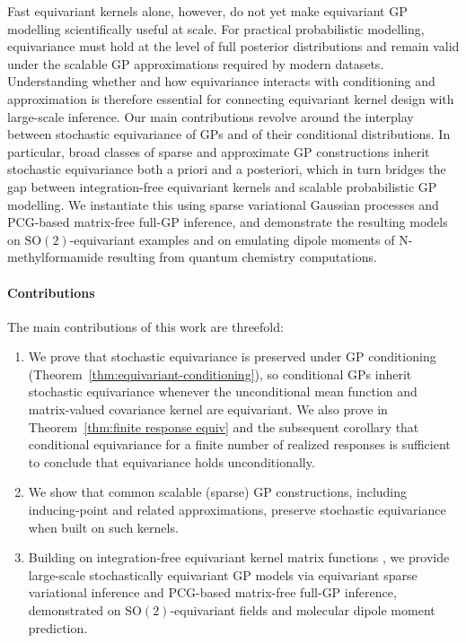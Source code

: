 \documentclass[11pt,a4paper]{article}
\begin{document}
Fast equivariant kernels alone, however, do not yet make equivariant GP modelling scientifically useful at scale. For practical probabilistic modelling, equivariance must hold at the level of full posterior distributions and remain valid under the scalable GP approximations required by modern datasets. Understanding whether and how equivariance interacts with conditioning and approximation is therefore essential for connecting equivariant kernel design with large-scale inference. Our main contributions revolve around the interplay between stochastic equivariance of GPs and of their conditional distributions. In particular, broad classes of sparse and approximate GP constructions inherit stochastic equivariance both a priori and a posteriori, which in turn bridges the gap between integration-free equivariant kernels and scalable probabilistic GP modelling. We instantiate this using sparse variational Gaussian processes and PCG-based matrix-free full-GP inference, and demonstrate the resulting models on $\mathrm{SO}(2)$-equivariant examples and on emulating dipole moments of N-methylformamide resulting from quantum chemistry computations.

\paragraph{Contributions}
The main contributions of this work are threefold:
\begin{enumerate}
    \item We prove that stochastic equivariance is preserved under GP conditioning (Theorem~\ref{thm:equivariant-conditioning}), so conditional GPs inherit stochastic equivariance whenever the unconditional mean function and matrix-valued covariance kernel are equivariant. We also prove in Theorem~\ref{thm:finite response equiv} and the subsequent corollary that conditional equivariance for a finite number of realized responses is sufficient to conclude that equivariance holds unconditionally.
    \item We show that common scalable (sparse) GP constructions, including inducing-point and related approximations, preserve stochastic equivariance when built on such kernels.
    \item Building on integration-free equivariant kernel matrix functions \cite{steinertintegration}, we provide large-scale stochastically equivariant GP models via equivariant sparse variational inference and PCG-based matrix-free full-GP inference, demonstrated on $\mathrm{SO}(2)$-equivariant fields and molecular dipole moment prediction.
\end{enumerate}
\end{document}
